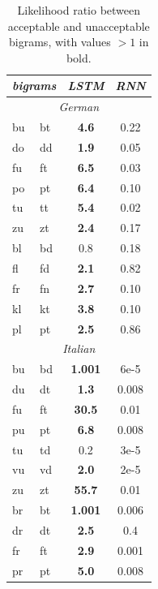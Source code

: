 \begin{table}[t]
  \begin{center}
    \begin{tabular}{ll|cc}
      \multicolumn{2}{c}{\emph{bigrams}}&\emph{LSTM}&\emph{RNN}\\
      \hline
      \multicolumn{4}{c}{\emph{German}}\\
      \hline
           bu &  bt &  \textbf{ 4.6} &  0.22     \\
           do &  dd &  \textbf{ 1.9} &  0.05     \\
           fu &  ft &  \textbf{ 6.5} &  0.03     \\
           po &  pt &  \textbf{ 6.4} &  0.10     \\
           tu &  tt &  \textbf{ 5.4} &  0.02     \\
           zu &  zt &  \textbf{ 2.4} &  0.17     \\ \hline
           bl &  bd &   0.8          & 0.18       \\
           fl &  fd &  \textbf{ 2.1} & 0.82      \\
           fr &  fn &  \textbf{ 2.7} & 0.10      \\
           kl &  kt &  \textbf{ 3.8} & 0.10      \\
           pl &  pt &  \textbf{ 2.5} & 0.86      \\

      \hline
      \multicolumn{4}{c}{\emph{Italian}}\\
      \hline
	    bu & bd & \textbf{ 1.001} & 6e-5 \\
	    du & dt & \textbf{ 1.3} & 0.008 \\
	    fu & ft & \textbf{ 30.5} & 0.01 \\
	    pu & pt & \textbf{ 6.8} & 0.008 \\
	    tu & td &  0.2 & 3e-5 \\
	    vu & vd & \textbf{ 2.0} & 2e-5 \\
	    zu & zt & \textbf{ 55.7} & 0.01 \\ \hline
	    br & bt & \textbf{ 1.001}  &  0.006 \\
	    dr & dt & \textbf{ 2.5} & 0.4 \\
	    fr & ft & \textbf{ 2.9} & 0.001 \\
	    pr & pt & \textbf{ 5.0} & 0.008 \\
    \end{tabular}
  \end{center}
  \caption{\label{tab:phonotactics-results} Likelihood ratio between acceptable and unacceptable bigrams,    with values $>1$ in bold.}
\end{table}


